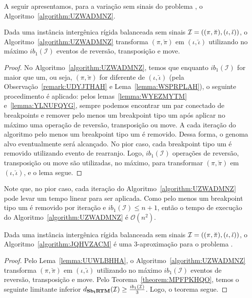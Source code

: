 A seguir apresentamos, para a variação sem sinais do problema \SbIRTM{}, o Algoritmo~\ref{algorithm:UZWADMNZ}.



\begin{lemma}\label{lemma:UUWLBHHA}
Dada uma instância intergênica rígida balanceada sem sinais $\mathcal{I}=((\pi,\breve\pi),\break(\iota,\breve\iota))$, o Algoritmo~\ref{algorithm:UZWADMNZ} transforma $(\pi,\breve\pi)$ em $(\iota,\breve\iota)$ utilizando no máximo $ib_1(\mathcal{I})$ eventos de reversão, transposição e move.
\end{lemma}
\begin{proof}
  No Algoritmo~\ref{algorithm:UZWADMNZ}, temos que enquanto $ib_1(\mathcal{I})$ for maior que um, ou seja, $(\pi,\breve\pi)$ for diferente de $(\iota,\breve\iota)$ (pela Observação~\ref{remark:UDYJTHAH} e Lema~\ref{lemma:WSPRPLAH}), o seguinte procedimento é aplicado: pelos lemas~\ref{lemma:WYEZMYTM} e~\ref{lemma:YLNUFQYG}, sempre podemos encontrar um par conectado de breakpoints e remover pelo menos um breakpoint tipo um após aplicar no máximo uma operação de reversão, transposição ou move. A cada iteração do algoritmo pelo menos um breakpoint tipo um é removido. Dessa forma, o genoma alvo eventualmente será alcançado. No pior caso, cada breakpoint tipo um é removido utilizando evento de rearranjo. Logo, $ib_1(\mathcal{I})$ operações de reversão, transposição ou move são utilizadas, no máximo, para transformar $(\pi,\breve\pi)$ em $(\iota,\breve\iota)$, e o lema segue.
\end{proof}

Note que, no pior caso, cada iteração do Algoritmo~\ref{algorithm:UZWADMNZ} pode levar um tempo linear para ser aplicada. Como pelo menos um breakpoint tipo um é removido por iteração e $ib_1(\mathcal{I}) \le {n+1}$, então o tempo de execução do Algoritmo~\ref{algorithm:UZWADMNZ} é $\mathcal{O}(n^2)$.  

\begin{theorem}\label{theorem:EANLWIUO}
Dada uma instância intergênica rígida balanceada sem sinais $\mathcal{I}=\break((\pi,\breve\pi),(\iota,\breve\iota))$, o Algoritmo~\ref{algorithm:JQHVZACM} é uma $3$-aproximação para o problema \SbIRTM{}.
\end{theorem}
\begin{proof}
Pelo Lema~\ref{lemma:UUWLBHHA}, o Algoritmo~\ref{algorithm:UZWADMNZ} transforma $(\pi,\breve\pi)$ em $(\iota,\breve\iota)$ utilizando no máximo $ib_1(\mathcal{I})$ eventos de reversão, transposição e move. Pelo Teorema~\ref{theorem:MPFPKHQO}, temos o seguinte limitante inferior $d_{\textbf{Sb\textsubscript{I}RTM}}(\mathcal{I}) \ge \frac{ib_1(\mathcal{I})}{3}$. Logo, o teorema segue. 
\end{proof}

